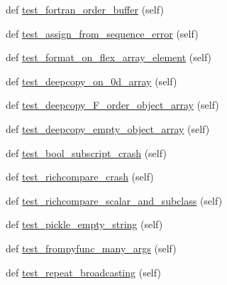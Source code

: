 \begin{DoxyCompactItemize}
\item 
def \hyperlink{classnumpy_1_1core_1_1tests_1_1test__regression_1_1TestRegression_a4a7040fa3f04d8cbb7c6d211c759fd74}{test\+\_\+fortran\+\_\+order\+\_\+buffer} (self)
\item 
def \hyperlink{classnumpy_1_1core_1_1tests_1_1test__regression_1_1TestRegression_a8835aa200e4fae97bb256fb809b9cd5a}{test\+\_\+assign\+\_\+from\+\_\+sequence\+\_\+error} (self)
\item 
def \hyperlink{classnumpy_1_1core_1_1tests_1_1test__regression_1_1TestRegression_a25068cbcff1bf208410f483d209d575f}{test\+\_\+format\+\_\+on\+\_\+flex\+\_\+array\+\_\+element} (self)
\item 
def \hyperlink{classnumpy_1_1core_1_1tests_1_1test__regression_1_1TestRegression_a27a099dc9ac30e6338c73b1afdc2b67d}{test\+\_\+deepcopy\+\_\+on\+\_\+0d\+\_\+array} (self)
\item 
def \hyperlink{classnumpy_1_1core_1_1tests_1_1test__regression_1_1TestRegression_a8c15d4f76077a2509b3f31dc84d57e64}{test\+\_\+deepcopy\+\_\+\+F\+\_\+order\+\_\+object\+\_\+array} (self)
\item 
def \hyperlink{classnumpy_1_1core_1_1tests_1_1test__regression_1_1TestRegression_a70467f72a3697db16e36cc9ec6e8b236}{test\+\_\+deepcopy\+\_\+empty\+\_\+object\+\_\+array} (self)
\item 
def \hyperlink{classnumpy_1_1core_1_1tests_1_1test__regression_1_1TestRegression_aa85a930f0bdbe917f796611b996dff19}{test\+\_\+bool\+\_\+subscript\+\_\+crash} (self)
\item 
def \hyperlink{classnumpy_1_1core_1_1tests_1_1test__regression_1_1TestRegression_a21efe226c21623dccb48e2c92b0380a0}{test\+\_\+richcompare\+\_\+crash} (self)
\item 
def \hyperlink{classnumpy_1_1core_1_1tests_1_1test__regression_1_1TestRegression_a820ce30c4cdf095dd1f22b0b7ef49540}{test\+\_\+richcompare\+\_\+scalar\+\_\+and\+\_\+subclass} (self)
\item 
def \hyperlink{classnumpy_1_1core_1_1tests_1_1test__regression_1_1TestRegression_a76a5e72c68ffcef029d302c391c55071}{test\+\_\+pickle\+\_\+empty\+\_\+string} (self)
\item 
def \hyperlink{classnumpy_1_1core_1_1tests_1_1test__regression_1_1TestRegression_a7fd4a31eab8f0307bfab7b39a7bb89a3}{test\+\_\+frompyfunc\+\_\+many\+\_\+args} (self)
\item 
def \hyperlink{classnumpy_1_1core_1_1tests_1_1test__regression_1_1TestRegression_a4115676579f985a81652ee95aa32ca29}{test\+\_\+repeat\+\_\+broadcasting} (self)

\end{DoxyCompactItemize}

